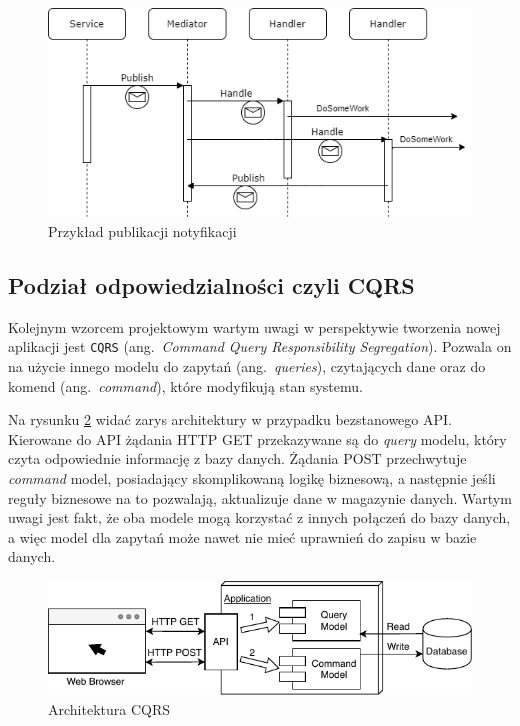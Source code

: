 \begin{figure}[h]
	\centering
	\includegraphics[width=.8\linewidth]{rys02/mediatR-Notification.png}
	\caption{Przykład publikacji notyfikacji}
	\label{fig:mediatR-Event}
\end{figure}

\subsection{Podział odpowiedzialności czyli CQRS}
\label{subsec:cqrs}

Kolejnym wzorcem projektowym wartym uwagi w perspektywie tworzenia nowej aplikacji jest \texttt{CQRS} (ang.~\emph{Command Query Responsibility Segregation}). Pozwala on na użycie innego modelu do zapytań (ang.~\emph{queries}), czytających dane oraz do komend (ang.~\emph{command}), które modyfikują stan systemu. 

Na rysunku \ref{fig:cqrs-architecture} widać zarys architektury w przypadku bezstanowego API. Kierowane do API żądania HTTP GET przekazywane są do \emph{query} modelu, który czyta odpowiednie informację z bazy danych. Żądania POST przechwytuje \emph{command} model, posiadający skomplikowaną logikę biznesową, a następnie jeśli reguły biznesowe na to pozwalają, aktualizuje dane w magazynie danych. Wartym uwagi jest fakt, że oba modele mogą korzystać z innych połączeń do bazy danych, a więc model dla zapytań może nawet nie mieć uprawnień do zapisu w bazie danych.

\begin{figure}[h]
	\centering
	\includegraphics[width=.9\linewidth]{rys02/cqrs01.pdf}
	\caption{Architektura CQRS}
	\label{fig:cqrs-architecture}
\end{figure}

